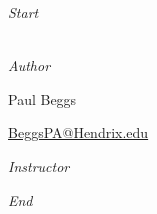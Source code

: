 \documentclass[12pt, oneside]{book}
\begin{document}
\begin{titlepage}
\begin{center}
\begin{large}
\textit{Start}  \\[1ex]
{\scshape \startdate} \\[0.3\baselineskip] %

\vspace*{1\baselineskip}

\emph{Author} \\[1ex]
{\Large Paul Beggs \\ \par} %
{\href{mailto:BeggsPA@Hendrix.edu}{{BeggsPA@Hendrix.edu}}}\\ %

\vspace*{1\baselineskip}

\textit{Instructor} \\[1ex] %
\professor

\vspace*{1\baselineskip}

\textit{End}\\[1ex]
{\scshape  \customenddate} \\[0.3\baselineskip] %

\thispagestyle{empty} 

\end{large}
\end{center}
\end{titlepage}
\pagebreak




	


\end{document}
